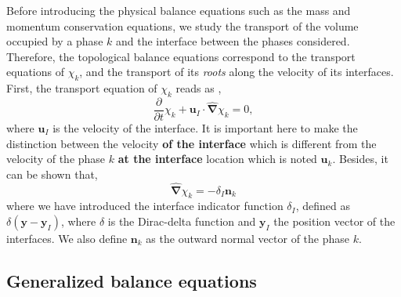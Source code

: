 \documentclass[twocolumn]{My_article}
\newcommand{\nablabh}{\hat{\bm{\nabla}}}
\newcommand{\pddt}{\frac{\partial}{\partial t}}
\begin{document}
Before introducing the physical balance equations such as the mass and momentum conservation equations, we study the transport of the volume occupied by a phase $k$ and the interface between the phases considered.
Therefore, the topological balance equations correspond to the transport equations of $\chi_k$, and the transport of its \textit{roots} along the velocity of its interfaces.
First, the transport equation of $\chi_k$ reads as \citep{drew1983mathematical,kataoka1986local,morel2015mathematical},
\begin{equation}
    \pddt \chi_k
    + \textbf{u}_I \cdot \nablabh \chi_k
    = 0,
    \label{eq:phaseindicator_transport}
\end{equation}
where $\textbf{u}_I$ is the velocity of the interface.
It is important here to make the distinction between the velocity \textbf{of the interface} which is different from the velocity of the phase $k$ \textbf{at the interface} location which is noted $\textbf{u}_k$.
Besides, it can be shown \citep{tryggvason2011direct} that,
\begin{equation}
    \nablabh \chi_k
    = - \delta_I \textbf{n}_k
\end{equation}
where we have introduced the interface indicator function $\delta_I$, defined as $\delta(\textbf{y}-\textbf{y}_I)$, where $\delta$ is the Dirac-delta function and $\textbf{y}_I$ the position vector of the interfaces.
We also define $\textbf{n}_k$ as the outward normal vector of the phase $k$.

\subsection{Generalized balance equations}
\end{document}
